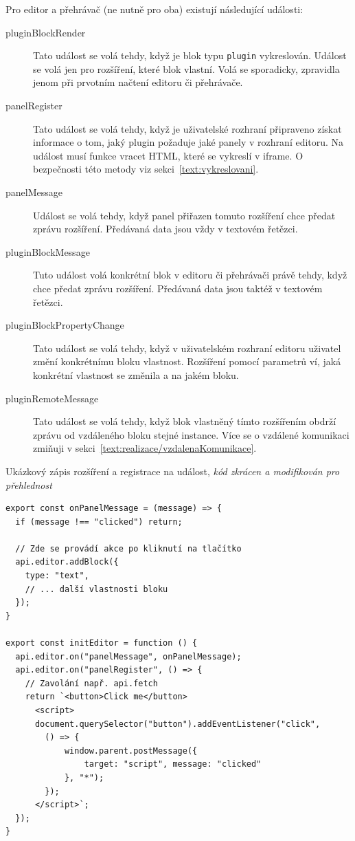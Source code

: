 Pro editor a přehrávač (ne nutně pro oba) existují následující události:

\begin{description}
    \item[pluginBlockRender] Tato událost se volá tehdy, když je blok typu \texttt{plugin} vykreslován. Událost se volá jen pro rozšíření, které blok vlastní. Volá se sporadicky, zpravidla jenom při prvotním načtení editoru či přehrávače. 
    \item[panelRegister] Tato událost se volá tehdy, když je uživatelské rozhraní připraveno získat informace o tom, jaký plugin požaduje jaké panely v rozhraní editoru. Na událost musí funkce vracet HTML, které se vykreslí v iframe. O bezpečnosti této metody viz sekci~\ref{text:vykreslovani}.
    \item[panelMessage] Událost se volá tehdy, když panel přiřazen tomuto rozšíření chce předat zprávu rozšíření. Předávaná data jsou vždy v textovém řetězci.
    \item[pluginBlockMessage] Tuto událost volá konkrétní blok v editoru či přehrávači právě tehdy, když chce předat zprávu rozšíření. Předávaná data jsou taktéž v textovém řetězci.
    \item[pluginBlockPropertyChange] Tato událost se volá tehdy, když v uživatelském rozhraní editoru uživatel změní konkrétnímu bloku vlastnost. Rozšíření pomocí parametrů ví, jaká konkrétní vlastnost se změnila a na jakém bloku.
    \item[pluginRemoteMessage] Tato událost se volá tehdy, když blok vlastněný tímto rozšířením obdrží zprávu od vzdáleného bloku stejné instance. Více se o vzdálené komunikaci zmiňuji v sekci~\ref{text:realizace/vzdalenaKomunikace}. 
\end{description}

\begin{listing}[ht!]
\caption[Ukázkový zápis rozšíření a registrace na událost]{Ukázkový zápis rozšíření a registrace na událost, \textit{kód zkrácen a modifikován pro přehlednost}}\label{code:registraceUdalosti}
\begin{verbatim}
export const onPanelMessage = (message) => {
  if (message !== "clicked") return;

  // Zde se provádí akce po kliknutí na tlačítko
  api.editor.addBlock({
    type: "text",
    // ... další vlastnosti bloku
  });
}

export const initEditor = function () {
  api.editor.on("panelMessage", onPanelMessage);
  api.editor.on("panelRegister", () => {
    // Zavolání např. api.fetch
    return `<button>Click me</button>
      <script>
      document.querySelector("button").addEventListener("click", 
        () => {
            window.parent.postMessage({
                target: "script", message: "clicked"
            }, "*");
        });
      </script>`;
  });
}
\end{verbatim}
\end{listing}


